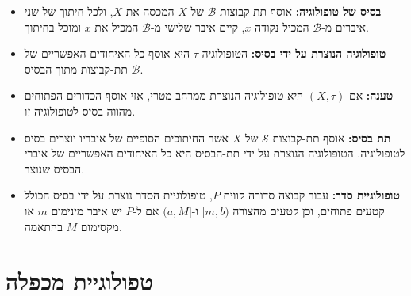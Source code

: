 \documentclass{tstextbook}
\begin{document}
\begin{summary}
  \begin{itemize}
    \item \textbf{בסיס של טופולוגיה:} אוסף תת-קבוצות \(\mathcal{B}\) של \(X\) המכסה את \(X\), ולכל חיתוך של שני איברים מ-\(\mathcal{B}\) המכיל נקודה \(x\), קיים איבר שלישי מ-\(\mathcal{B}\) המכיל את \(x\) ומוכל בחיתוך.
    \item \textbf{טופולוגיה הנוצרת על ידי בסיס:} הטופולוגיה \(\tau\) היא אוסף כל האיחודים האפשריים של תת-קבוצות מתוך הבסיס \(\mathcal{B}\).
    \item \textbf{טענה:} אם \(\left( X,\tau \right)\) היא טופולוגיה הנוצרת ממרחב מטרי, אזי אוסף הכדורים הפתוחים מהווה בסיס לטופולוגיה זו.
    \item \textbf{תת בסיס:} אוסף תת-קבוצות \(\mathcal{S}\) של \(X\) אשר החיתוכים הסופיים של איבריו יוצרים בסיס לטופולוגיה. הטופולוגיה הנוצרת על ידי תת-הבסיס היא כל האיחודים האפשריים של איברי הבסיס שנוצר.
    \item \textbf{טופולוגיית סדר:} עבור קבוצה סדורה קווית \(P\), טופולוגיית הסדר נוצרת על ידי בסיס הכולל קטעים פתוחים, וכן קטעים מהצורה \([m,b)\) ו-\((a,M]\) אם ל-\(P\) יש איבר מינימום \(m\) או מקסימום \(M\) בהתאמה.
  \end{itemize}
\end{summary}
\section{טפולוגיית מכפלה}
\end{document}

